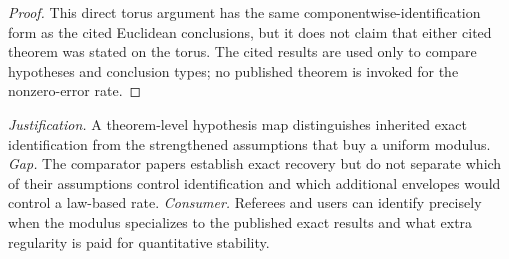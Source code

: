 \documentclass{article}
\begin{document}
\begin{proof}
This direct torus argument has the same componentwise-identification form as the cited Euclidean conclusions, but it does not claim that either cited theorem was stated on the torus. The cited results are used only to compare hypotheses and conclusion types; no published theorem is invoked for the nonzero-error rate.
\end{proof}
\par\smallskip\noindent \textit{Justification.} A theorem-level hypothesis map distinguishes inherited exact identification from the strengthened assumptions that buy a uniform modulus. \textit{Gap.} The comparator papers establish exact recovery but do not separate which of their assumptions control identification and which additional envelopes would control a law-based rate. \textit{Consumer.} Referees and users can identify precisely when the modulus specializes to the published exact results and what extra regularity is paid for quantitative stability.
\end{document}
